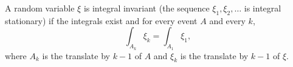 A random variable $\xi$ is integral invariant (the sequence $\xi_1, \xi_2, \ldots$ is integral stationary) if the integrals exist and for every event $A$ and every $k$,
$$\int_{A_k} \xi_k = \int_{A_1} \xi_1,$$
where $A_k$ is the translate by $k-1$ of $A$ and $\xi_k$ is the translate by $k-1$ of $\xi$.
